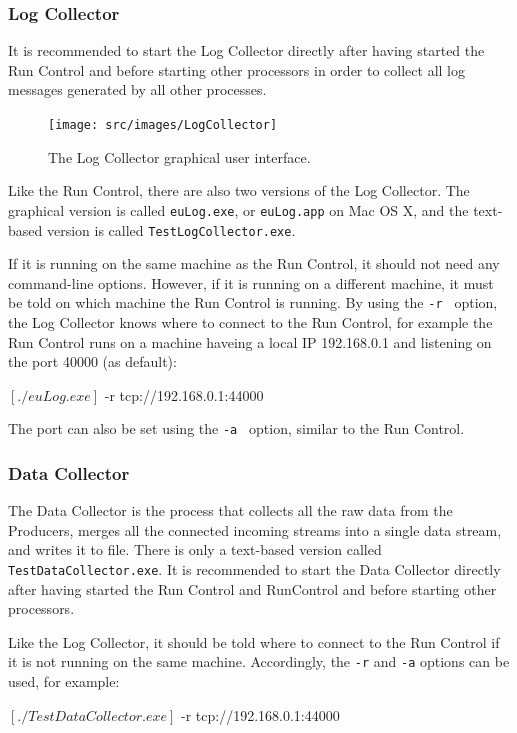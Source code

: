 \subsubsection{Log Collector}
It is recommended to start the Log Collector directly after having started the Run Control and before starting other processors in order to collect all log messages generated by all other processes.

\begin{figure}[htb]
  \begin{center}
    \texttt{[image: src/images/LogCollector]}
    \caption{The Log Collector graphical user interface.}
    \label{fig:LogCollector}
  \end{center}
\end{figure}

Like the Run Control, there are also two versions of the Log Collector.
The graphical version is called \texttt{euLog.exe}, or \texttt{euLog.app} on Mac OS X,
and the text-based version is called \texttt{TestLogCollector.exe}.

If it is running on the same machine as the Run Control, it should not need any command-line options.
However, if it is running on a different machine, it must be told on which machine the Run Control is running.
By using the \texttt{-r } option, the Log Collector knows where to connect to the Run Control, for example the Run Control runs on a machine haveing a local IP 192.168.0.1 and listening on the port 40000 (as default):
\begin{listing}[mybash]
$[./euLog.exe]$ -r tcp://192.168.0.1:44000
\end{listing}
The port can also be set using the \texttt{-a } option, similar to the Run Control.

\subsubsection{Data Collector}
The Data Collector is the process that collects all the raw data from the Producers,
merges all the connected incoming streams into a single data stream, and writes it to file.
There is only a text-based version called \texttt{TestDataCollector.exe}.
It is recommended to start the Data Collector directly after having started the Run Control and RunControl and before starting other processors.

Like the Log Collector, it should be told where to connect to the Run Control if it is not running on the same machine.
Accordingly, the \texttt{-r} and \texttt{-a} options can be used, for example:
\begin{listing}[mybash]
$[./TestDataCollector.exe]$ -r tcp://192.168.0.1:44000
\end{listing}

